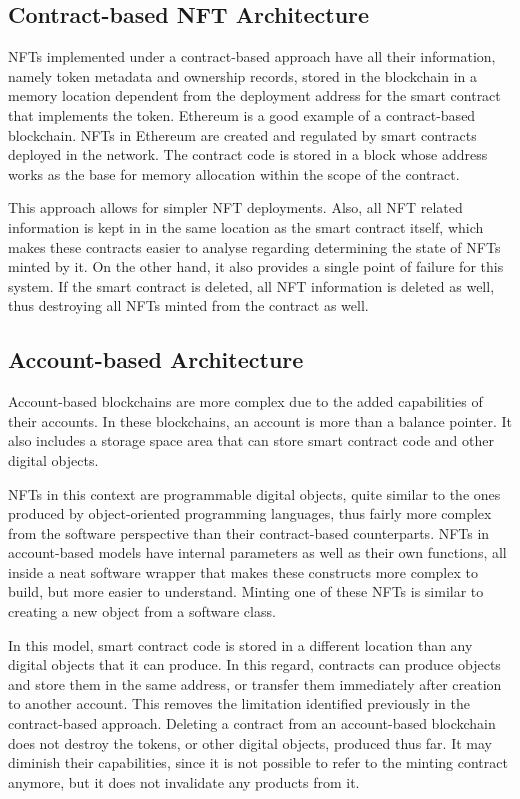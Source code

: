 \documentclass[../main.tex]{subfiles}
\begin{document}
\subsection{Contract-based NFT Architecture}
NFTs implemented under a contract-based approach have all their information, namely token metadata and ownership records, stored in the blockchain in a memory location dependent from the deployment address for the smart contract that implements the token. Ethereum is a good example of a contract-based blockchain. NFTs in Ethereum are created and regulated by smart contracts deployed in the network. The contract code is stored in a block whose address works as the base for memory allocation within the scope of the contract.
\par
This approach allows for simpler NFT deployments. Also, all NFT related information is kept in in the same location as the smart contract itself, which makes these contracts easier to analyse regarding determining the state of NFTs minted by it. On the other hand, it also provides a single point of failure for this system. If the smart contract is deleted, all NFT information is deleted as well, thus destroying all NFTs minted from the contract as well.

\subsection{Account-based Architecture}
Account-based blockchains are more complex due to the added capabilities of their accounts. In these blockchains, an account is more than a balance pointer. It also includes a storage space area that can store smart contract code and other digital objects.
\par
NFTs in this context are programmable digital objects, quite similar to the ones produced by object-oriented programming languages, thus fairly more complex from the software perspective than their contract-based counterparts. NFTs in account-based models have internal parameters as well as their own functions, all inside a neat software wrapper that makes these constructs more complex to build, but more easier to understand. Minting one of these NFTs is similar to creating a new object from a software class.
\par
In this model, smart contract code is stored in a different location than any digital objects that it can produce. In this regard, contracts can produce objects and store them in the same address, or transfer them immediately after creation to another account. This removes the limitation identified previously in the contract-based approach. Deleting a contract from an account-based blockchain does not destroy the tokens, or other digital objects, produced thus far. It may diminish their capabilities, since it is not possible to refer to the minting contract anymore, but it does not invalidate any products from it.
\end{document}
